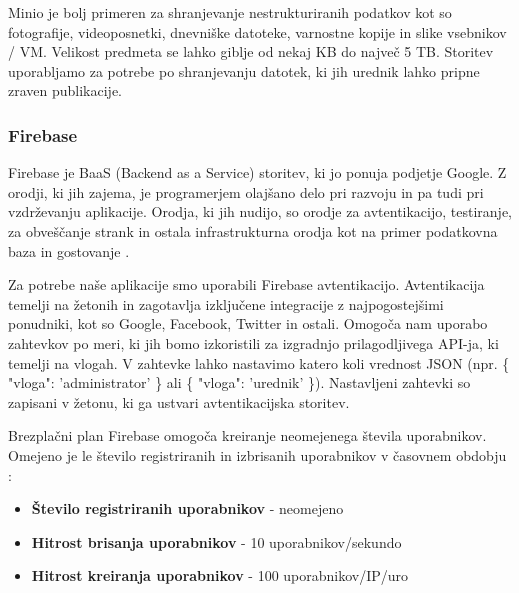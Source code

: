 \documentclass[a4paper, 12pt]{book}
\begin{document}
Minio je bolj primeren za shranjevanje nestrukturiranih podatkov kot so fotografije, videoposnetki, dnevniške datoteke, varnostne kopije in slike vsebnikov / VM. Velikost predmeta se lahko giblje od nekaj KB do največ 5 TB. Storitev uporabljamo za potrebe po shranjevanju datotek, ki jih urednik lahko pripne zraven publikacije.



\subsubsection{Firebase}
Firebase je BaaS (Backend as a Service) storitev, ki jo ponuja podjetje Google. Z orodji, ki jih zajema, je programerjem olajšano delo pri razvoju in pa tudi pri vzdrževanju aplikacije. Orodja, ki jih nudijo, so orodje za avtentikacijo, testiranje, za obveščanje strank in ostala infrastrukturna orodja kot na primer podatkovna baza in gostovanje \cite{firebase-about}.

Za potrebe naše aplikacije smo uporabili Firebase avtentikacijo. Avtentikacija temelji na žetonih in zagotavlja izključene integracije z najpogostejšimi ponudniki, kot so Google, Facebook, Twitter in ostali. Omogoča nam uporabo zahtevkov po meri, ki jih bomo izkoristili za izgradnjo prilagodljivega API-ja, ki temelji na vlogah. V zahtevke lahko nastavimo katero koli vrednost JSON (npr. \{ "vloga": 'administrator' \} ali \{ "vloga": 'urednik' \}). Nastavljeni zahtevki so zapisani v žetonu, ki ga ustvari avtentikacijska storitev.

Brezplačni plan Firebase omogoča kreiranje neomejenega števila uporabnikov. Omejeno je le število registriranih in izbrisanih uporabnikov v časovnem obdobju \cite{firebase-limits}:


\begin{itemize}
	\item \textbf{Število registriranih uporabnikov} - neomejeno
	\item \textbf{Hitrost brisanja uporabnikov} - 10 uporabnikov/sekundo
	\item \textbf{Hitrost kreiranja uporabnikov} - 100 uporabnikov/IP/uro
\end{itemize}
\end{document}
